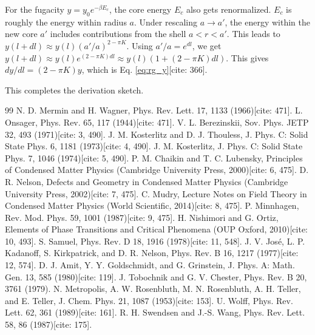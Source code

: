 \documentclass[11pt]{article}
\begin{document}
For the fugacity $y = y_0 e^{-\beta E_c}$, the core energy $E_c$ also gets renormalized. $E_c$ is roughly the energy within radius $a$. Under rescaling $a \to a'$, the energy within the new core $a'$ includes contributions from the shell $a < r < a'$. This leads to $y(l+dl) \approx y(l) (a'/a)^{2-\pi K}$. Using $a'/a = e^{dl}$, we get $y(l+dl) \approx y(l) e^{(2-\pi K)dl} \approx y(l) (1 + (2-\pi K)dl)$. This gives $dy/dl = (2-\pi K)y$, which is Eq. \eqref{eq:rg_y}[cite: 366].

This completes the derivation sketch.

\begin{thebibliography}{99}
 N. D. Mermin and H. Wagner, Phys. Rev. Lett. 17, 1133 (1966)[cite: 471].
 L. Onsager, Phys. Rev. 65, 117 (1944)[cite: 471].
 V. L. Berezinskii, Sov. Phys. JETP 32, 493 (1971)[cite: 3, 490].
 J. M. Kosterlitz and D. J. Thouless, J. Phys. C: Solid State Phys. 6, 1181 (1973)[cite: 4, 490].
 J. M. Kosterlitz, J. Phys. C: Solid State Phys. 7, 1046 (1974)[cite: 5, 490].
 P. M. Chaikin and T. C. Lubensky, Principles of Condensed Matter Physics (Cambridge University Press, 2000)[cite: 6, 475].
 D. R. Nelson, Defects and Geometry in Condensed Matter Physics (Cambridge University Press, 2002)[cite: 7, 475].
 C. Mudry, Lecture Notes on Field Theory in Condensed Matter Physics (World Scientific, 2014)[cite: 8, 475].
 P. Minnhagen, Rev. Mod. Phys. 59, 1001 (1987)[cite: 9, 475].
 H. Nishimori and G. Ortiz, Elements of Phase Transitions and Critical Phenomena (OUP Oxford, 2010)[cite: 10, 493].
 S. Samuel, Phys. Rev. D 18, 1916 (1978)[cite: 11, 548].
 J. V. José, L. P. Kadanoff, S. Kirkpatrick, and D. R. Nelson, Phys. Rev. B 16, 1217 (1977)[cite: 12, 574].
 D. J. Amit, Y. Y. Goldschmidt, and G. Grinstein, J. Phys. A: Math. Gen. 13, 585 (1980)[cite: 119].
 J. Tobochnik and G. V. Chester, Phys. Rev. B 20, 3761 (1979). %
 N. Metropolis, A. W. Rosenbluth, M. N. Rosenbluth, A. H. Teller, and E. Teller, J. Chem. Phys. 21, 1087 (1953)[cite: 153].
 U. Wolff, Phys. Rev. Lett. 62, 361 (1989)[cite: 161].
 R. H. Swendsen and J.-S. Wang, Phys. Rev. Lett. 58, 86 (1987)[cite: 175].

\end{thebibliography}
\end{document}
